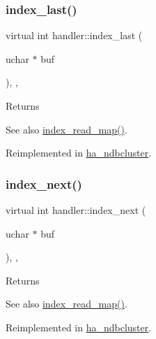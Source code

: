 \subsubsection{\texorpdfstring{index\+\_\+last()}{index\_last()}}
{\footnotesize\ttfamily virtual int handler\+::index\+\_\+last (\begin{DoxyParamCaption}\item[{uchar $\ast$}]{buf }\end{DoxyParamCaption})\hspace{0.3cm}{\ttfamily [inline]}, {\ttfamily [protected]}, {\ttfamily [virtual]}}

\begin{DoxyReturn}{Returns}

\end{DoxyReturn}
\begin{DoxySeeAlso}{See also}
\mbox{\hyperlink{classhandler_af8c2b258691e5baac8dd22d19c084b37}{index\+\_\+read\+\_\+map()}}. 
\end{DoxySeeAlso}


Reimplemented in \mbox{\hyperlink{classha__ndbcluster_a6f6e9347ec700ee952a998fa88ae68b2}{ha\+\_\+ndbcluster}}.

\mbox{\label{classhandler_aca48f687872e10a4fdc35b418d98b761}} 
\subsubsection{\texorpdfstring{index\+\_\+next()}{index\_next()}}
{\footnotesize\ttfamily virtual int handler\+::index\+\_\+next (\begin{DoxyParamCaption}\item[{uchar $\ast$}]{buf }\end{DoxyParamCaption})\hspace{0.3cm}{\ttfamily [inline]}, {\ttfamily [protected]}, {\ttfamily [virtual]}}

\begin{DoxyReturn}{Returns}

\end{DoxyReturn}
\begin{DoxySeeAlso}{See also}
\mbox{\hyperlink{classhandler_af8c2b258691e5baac8dd22d19c084b37}{index\+\_\+read\+\_\+map()}}. 
\end{DoxySeeAlso}


Reimplemented in \mbox{\hyperlink{classha__ndbcluster_a865afdc25ee4ca42fafde872e476e0ff}{ha\+\_\+ndbcluster}}.

